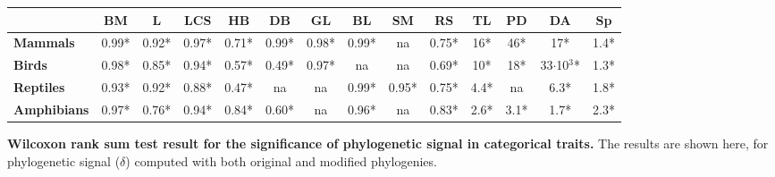\documentclass[11pt]{article}
\begin{document}
\begin{table}[h!]
\begin{center}
\begin{tabular}{|l|c|c|c|c|c|c|c|c|c|c|c|c|c|}
\multicolumn{1}{|c|}{}                                & \textbf{BM}    & \textbf{L}   & \textbf{LCS}   & \textbf{HB}   & \textbf{DB}   & \textbf{GL}   & \textbf{BL}   & \textbf{SM}   & \textbf{RS}   & \textbf{TL}           & \textbf{PD}           & \textbf{DA}                & \textbf{Sp}          \\ \hline
\textbf{Mammals}                                      & 0.99*           & 0.92*        & 0.97*          & 0.71*         & 0.99*         & 0.98*         & 0.99*          & na            & 0.75*         & 16*                   & 46*                   & 17*                        & 1.4*                 \\ \hline
\textbf{Birds}                                        & 0.98*           & 0.85*        & 0.94*          & 0.57*         & 0.49*         & 0.97*         & na            & na            & 0.69*         & 10*                   & 18*                   & 33$\cdot$10$^3$*           & 1.3*                 \\ \hline
\textbf{Reptiles}                                     & 0.93*          & 0.92*        & 0.88*          & 0.47*         & na            & na            & 0.99*          & 0.95*         & 0.75*         & 4.4*                  & na                    & 6.3*                       & 1.8*                 \\ \hline
\textbf{Amphibians}                                   & 0.97*          & 0.76*        & 0.94*          & 0.84*         & 0.60*         & na            & 0.96*         & na            & 0.83*         & 2.6*                  & 3.1*                  & 1.7*                       & 2.3*                 \\ \hline
\end{tabular}
\end{center}
\end{table}

\pagebreak
\begin{table}[h!]
\renewcommand{\baselinestretch}{1}
\renewcommand{\arraystretch}{1.2}
\begin{center}\fontsize{9}{11}\selectfont
\caption[Wilcoxon rank sum test results for the significance of phylogenetic signal in categorical traits]{\textbf{Wilcoxon rank sum test result for the significance of phylogenetic signal in categorical traits.} The results are shown here, for phylogenetic signal ($\delta$) computed with both original and modified phylogenies.}
\end{center}
\end{table}
\end{document}
